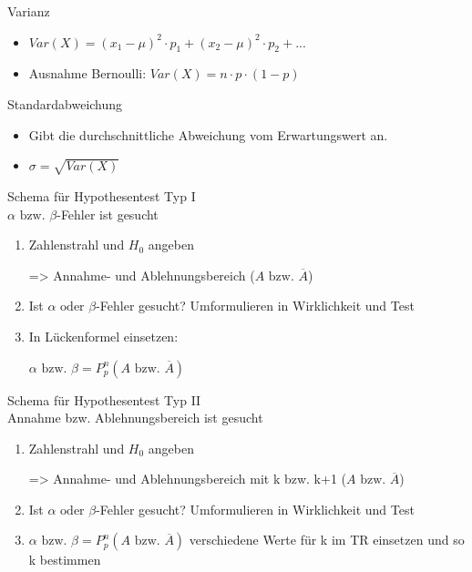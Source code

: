 \begin{frage}Varianz\end{frage}
\begin{antwort}\begin{itemize}
		\item $Var(X)=(x_1-\mu)^2 \cdot p_1+(x_2-\mu)^2 \cdot p_2+...$	
		\item Ausnahme Bernoulli: $Var(X)=n \cdot p \cdot (1-p)$	
	\end{itemize}\end{antwort}
\begin{frage}Standardabweichung\end{frage}
\begin{antwort}\begin{itemize}
		\item Gibt die durchschnittliche Abweichung vom Erwartungswert an.		
		\item $\sigma=\sqrt{Var(X)}$	
	\end{itemize}\end{antwort}
\begin{frage}Schema für Hypothesentest Typ I\\
	$\alpha \text{ bzw. }\beta$-Fehler ist gesucht\end{frage}
\begin{antwort}\begin{enumerate}
		\item Zahlenstrahl und $H_0$ angeben
		
		=> Annahme- und Ablehnungsbereich  ($A \text{ bzw. }\overline{A}$)	
		\item Ist  $\alpha \text{ oder }\beta$-Fehler gesucht? Umformulieren in Wirklichkeit und Test
		\item In Lückenformel einsetzen: 
		
		$\alpha \text{ bzw. }\beta=P^n_p(A\text{ bzw. }\overline{A})$	
	\end{enumerate}\end{antwort}
\begin{frage}Schema für Hypothesentest Typ II\\
	Annahme bzw. Ablehnungsbereich ist gesucht\end{frage}
\begin{antwort}\begin{enumerate}
		\item Zahlenstrahl und $H_0$ angeben
		
		=> Annahme- und Ablehnungsbereich mit k bzw. k+1 ($A \text{ bzw. }\overline{A}$)	
		\item Ist  $\alpha \text{ oder }\beta$-Fehler gesucht? Umformulieren in Wirklichkeit und Test
		\item $\alpha \text{ bzw. }\beta=P^n_p(A\text{ bzw. }\overline{A})$ verschiedene Werte für k im TR einsetzen und so k bestimmen
	\end{enumerate}\end{antwort}

